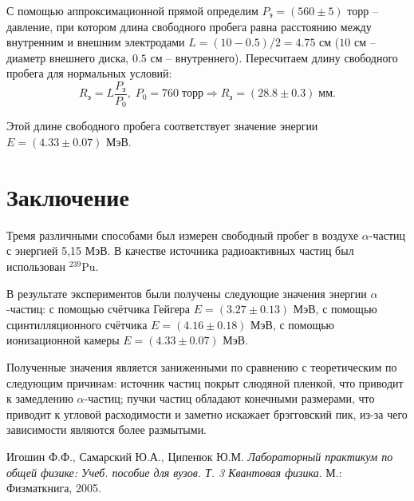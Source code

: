 \documentclass[a4paper, 12pt]{article}%
\begin{document}
    С помощью аппроксимационной прямой определим $P_{\text{э}} = (560 \pm 5)$ торр -- давление, при котором длина свободного пробега равна расстоянию между внутренним и внешним электродами $L = (10 - 0.5) / 2 = 4.75$ см ($10$ см -- диаметр внешнего диска, $0.5$ см -- внутреннего). Пересчитаем длину свободного пробега для нормальных условий:
    \begin{equation}
        R_{\text{э}} = L \frac{P_{\text{э}}}{P_0}, \; P_0 = 760 \; \text{торр} \Rightarrow R_{\text{э}} = (28.8 \pm 0.3) \; \text{мм}.
    \end{equation}

    Этой длине свободного пробега соответствует значение энергии $E = (4.33 \pm 0.07)$ МэВ.

\section{Заключение}

    Тремя различными способами был измерен свободный пробег в воздухе $\alpha$-частиц с энергией 5,15 МэВ. В качестве источника радиоактивных частиц был использован $^{239}$Pu.

    В результате экспериментов были получены следующие значения энергии $\alpha$-частиц: с помощью счётчика Гейгера $E = (3.27 \pm 0.13)$ МэВ, с помощью сцинтилляционного счётчика $E = (4.16 \pm 0.18)$ МэВ, с помощью ионизационной камеры $E = (4.33 \pm 0.07)$ МэВ.

    Полученные значения является заниженными по сравнению с теоретическим по следующим причинам: источник частиц покрыт слюдяной пленкой, что приводит к замедлению $\alpha$-частиц; пучки частиц обладают конечными размерами, что приводит к угловой расходимости и заметно искажает брэгговский пик, из-за чего зависимости являются более размытыми.
    
\begin{thebibliography}{9}
Игошин Ф.Ф., Самарский Ю.А., Ципенюк Ю.М. 
\textit{Лабораторный практикум по общей физике: Учеб. пособие для вузов. Т. 3 Квантовая физика}. 
М.: Физматкнига, 2005.
\end{thebibliography}
\end{document}
